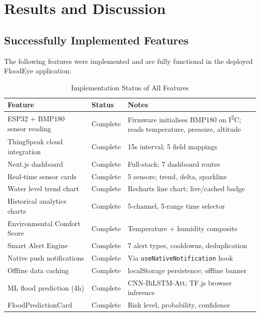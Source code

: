 \chapter{Results and Discussion}

\section{Successfully Implemented Features}

The following features were implemented and are fully functional in the deployed FloodEye application:

\begin{table}[htbp]
\centering
\caption{Implementation Status of All Features}
\begin{tabularx}{\linewidth}{|l|l|X|}
\hline
\rowcolor{FloodLight}
\textbf{Feature} & \textbf{Status} & \textbf{Notes} \\
\hline
ESP32 + BMP180 sensor reading & Complete & Firmware initialises BMP180 on I\textsuperscript{2}C; reads temperature, pressure, altitude \\
ThingSpeak cloud integration & Complete & 15s interval; 5 field mappings \\
Next.js dashboard & Complete & Full-stack; 7 dashboard routes \\
Real-time sensor cards & Complete & 5 sensors; trend, delta, sparkline \\
Water level trend chart & Complete & Recharts line chart; live/cached badge \\
Historical analytics charts & Complete & 5-channel, 5-range time selector \\
Environmental Comfort Score & Complete & Temperature + humidity composite \\
Smart Alert Engine & Complete & 7 alert types, cooldowns, deduplication \\
Native push notifications & Complete & Via \texttt{useNativeNotification} hook \\
Offline data caching & Complete & localStorage persistence; offline banner \\
ML flood prediction (4h) & Complete & CNN-BiLSTM-Att; TF.js browser inference \\
FloodPredictionCard & Complete & Risk level, probability, confidence \\

\end{tabularx}
\end{table}
